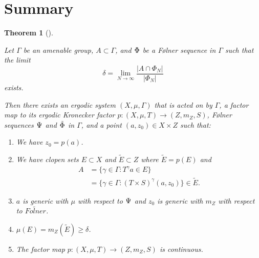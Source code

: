 \documentclass[
  british,
]{article}
\providecommand{\tightlist}{%
  \setlength{\itemsep}{0pt}\setlength{\parskip}{0pt}}
\theoremstyle{plain}
\theoremstyle{definition}
\theoremstyle{plain}
\newtheorem{theorem}{Theorem}[section]
\theoremstyle{remark}
\newcommand{\AmenableGroup}{{\Gamma}}
\newcommand{\AmenableGroupElement}{{\gamma}}
\newcommand{\CountingMeasure}[1]{{\left|#1\right|}}
\newcommand{\Folner}[1][\vphantom{}]{{\Phi}_{#1}}
\newcommand{\FurstenbergFolner}[1][{\vphantom{}}]{{\Psi}_{#1}}
\newcommand{\GroupAction}[2]{T^{#1}{#2}}
\newcommand{\KroneckerFactorMap}{p}
\newcommand{\KroneckerMeasure}{{m_Z}}
\newcommand{\KroneckerProductAction}[2]{(T\times S)^{#1}{#2}}
\newcommand{\KroneckerSpace}{{Z}}
\newcommand{\KroneckerSpaceElement}{{z}}
\newcommand{\Measure}{{\mu}}
\newcommand{\ShiftSpace}{{X}}
\newcommand{\FurstenbergSystem}{(\ShiftSpace,\Measure,T)}
\newcommand{\KroneckerFactor}{{(\KroneckerSpace,\KroneckerMeasure,S)}}
\begin{document}
\section{Summary}\label{summary}

\begin{theorem}[]\protect\hypertarget{thm-FCP-Kronecker}{}\label{thm-FCP-Kronecker}

Let \(\AmenableGroup\) be an amenable group,
\(A\subset \AmenableGroup\), and \(\Folner\) be a Følner sequence in
\(\AmenableGroup\) such that the limit
\[\delta=\lim_{N\rightarrow\infty}\frac{\CountingMeasure{A\cap\Folner[N]}}{\CountingMeasure{\Folner[N]}}\]
exists.

Then there exists an ergodic system
\((\ShiftSpace,\Measure,\AmenableGroup)\) that is acted on by
\(\AmenableGroup\), a factor map to its ergodic Kronecker factor
\(\KroneckerFactorMap: \FurstenbergSystem\rightarrow\KroneckerFactor\),
Følner sequences \(\FurstenbergFolner\) and \(\tilde{\Folner}\) in
\(\AmenableGroup\), and a point
\((a,\KroneckerSpaceElement_0)\in\ShiftSpace\times\KroneckerSpace\) such
that:

\begin{enumerate}
\def\labelenumi{\arabic{enumi}.}
\tightlist
\item
  We have \(\KroneckerSpaceElement_0=\KroneckerFactorMap(a)\).
\item
  We have clopen sets \(E\subset\ShiftSpace\) and
  \(\tilde{E}\subset\KroneckerSpace\) where
  \(\tilde{E}=\KroneckerFactorMap(E)\) and \begin{align*}
    A&=\{\AmenableGroupElement\in \AmenableGroup:\GroupAction{\AmenableGroupElement}{a}\in E\}
    \\&=\{\AmenableGroupElement\in \AmenableGroup:\KroneckerProductAction{\AmenableGroupElement}{(a,\KroneckerSpaceElement_0)\}\in \tilde{E}}.
  \end{align*}
\item
  \(a\) is generic with \(\Measure\) with respect to
  \(\FurstenbergFolner\) and \(\KroneckerSpaceElement_0\) is generic
  with \(\KroneckerMeasure\) with respect to \(\tilde{Folner}\).
\item
  \(\Measure(E)=\KroneckerMeasure(\tilde{E})\geq\delta\).
\item
  The factor map
  \(\KroneckerFactorMap: \FurstenbergSystem\rightarrow\KroneckerFactor\)
  is continuous.
\end{enumerate}

\end{theorem}
\end{document}
